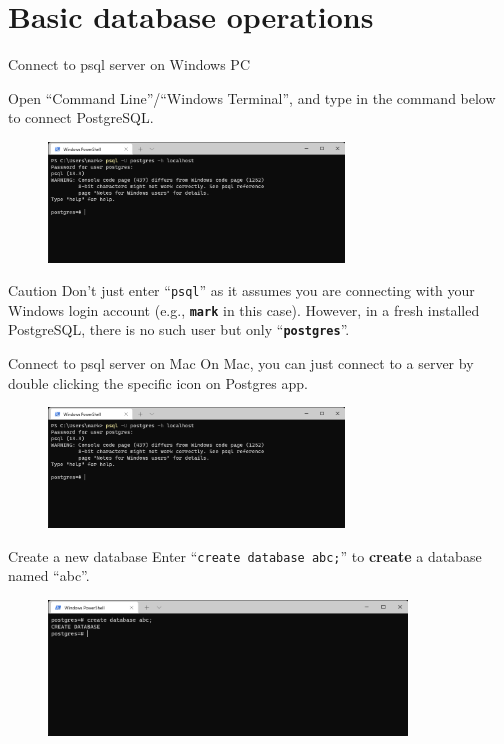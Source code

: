 \section*{Basic database operations}

\begin{frame}[fragile]{Connect to psql server on Windows PC}

Open ``Command Line''/``Windows Terminal'', and type in the command below to connect PostgreSQL.
\begin{figure}
	\includegraphics[width=0.7\textwidth]{t0-psql/images/1.png}
\end{figure}

\begin{alertblock}{Caution}
	Don't just enter ``\texttt{psql}'' as it assumes you are connecting with your Windows login account (e.g., \texttt{\textbf{mark}} in this case). However, in a fresh installed PostgreSQL, there is no such user but only ``\texttt{\textbf{postgres}}''. 
\end{alertblock}

\end{frame}

\begin{frame}[fragile]{Connect to psql server on Mac}
	On Mac, you can just connect to a server by double clicking the specific icon on Postgres app.
	\begin{figure}
		\includegraphics[width=0.7\textwidth]{t0-psql/images/1.png}
	\end{figure}
\end{frame}

\begin{frame}[fragile]{Create a new database}
	Enter ``\texttt{create database abc;}'' to \textbf{create} a database named ``abc''.
	\begin{figure}
		\includegraphics[width=0.85\textwidth]{t0-psql/images/3.png}
	\end{figure}
	
\end{frame}

